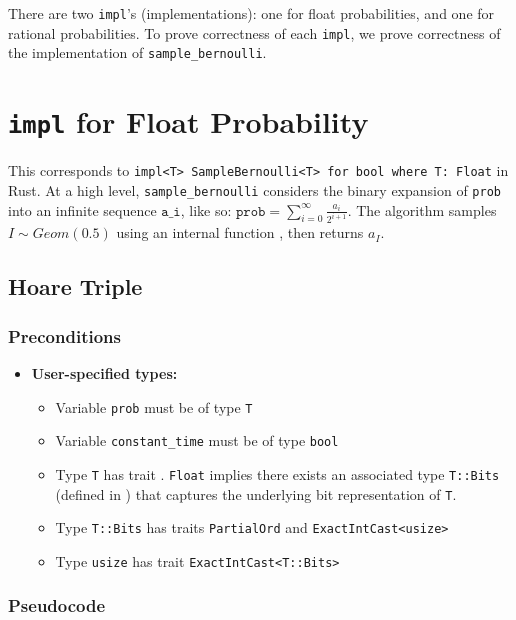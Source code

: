 \documentclass{article}
\begin{document}
There are two \texttt{impl}'s (implementations): one for float probabilities, and one for rational probabilities.
To prove correctness of each \texttt{impl}, we prove correctness of the implementation of \texttt{sample\_bernoulli}.

\tableofcontents

\section{\texttt{impl} for Float Probability}
This corresponds to \texttt{impl<T> SampleBernoulli<T> for bool where T: Float} in Rust.
At a high level, \texttt{sample\_bernoulli} considers the binary expansion of \texttt{prob} into an infinite sequence $\texttt{a\_i}$, 
like so: $\texttt{prob} = \sum_{i = 0}^{\infty} \frac{a_i}{2^{i + 1}}$. 
The algorithm samples $I \sim Geom(0.5)$ using an internal function , then returns $a_I$. 

\subsection{Hoare Triple}
\subsubsection*{Preconditions}
\begin{itemize}
    \item \textbf{User-specified types:}
    \begin{itemize}
        \item Variable \texttt{prob} must be of type \texttt{T}
        \item Variable \texttt{constant\_time} must be of type \texttt{bool}
        \item Type \texttt{T} has trait . 
            \texttt{Float} implies there exists an associated type \texttt{T::Bits} (defined in ) that captures the underlying bit representation of \texttt{T}.
        \item Type \texttt{T::Bits} has traits \texttt{PartialOrd} and \texttt{ExactIntCast<usize>}
        \item Type \texttt{usize} has trait \texttt{ExactIntCast<T::Bits>}
    \end{itemize}
\end{itemize}

\subsubsection*{Pseudocode}
\end{document}
